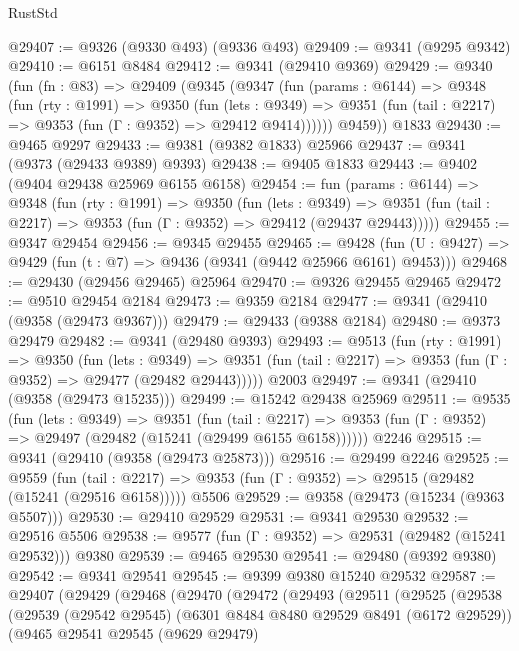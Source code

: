 \begin{lexlean}{RustStd}
\begin{coremodule}
@29407 := @9326 (@9330 @493) (@9336 @493)
@29409 := @9341 (@9295 @9342)
@29410 := @6151 @8484
@29412 := @9341 (@29410 @9369)
@29429 := @9340
    (fun (fn : @83) =>
    @29409
      (@9345
        (@9347
          (fun (params : @6144) =>
          @9348
            (fun (rty : @1991) =>
            @9350
              (fun (lets : @9349) =>
              @9351 (fun (tail : @2217) => @9353 (fun (Γ : @9352) => @29412 @9414))))))
        @9459))
    @1833
@29430 := @9465 @9297
@29433 := @9381 (@9382 @1833) @25966
@29437 := @9341 (@9373 (@29433 @9389) @9393)
@29438 := @9405 @1833
@29443 := @9402 (@9404 @29438 @25969 @6155 @6158)
@29454 := fun (params : @6144) =>
  @9348
    (fun (rty : @1991) =>
    @9350
      (fun (lets : @9349) =>
      @9351 (fun (tail : @2217) => @9353 (fun (Γ : @9352) => @29412 (@29437 @29443)))))
@29455 := @9347 @29454
@29456 := @9345 @29455
@29465 := @9428
    (fun (U : @9427) => @9429 (fun (t : @7) => @9436 (@9341 (@9442 @25966 @6161) @9453)))
@29468 := @29430 (@29456 @29465) @25964
@29470 := @9326 @29455 @29465
@29472 := @9510 @29454 @2184
@29473 := @9359 @2184
@29477 := @9341 (@29410 (@9358 (@29473 @9367)))
@29479 := @29433 (@9388 @2184)
@29480 := @9373 @29479
@29482 := @9341 (@29480 @9393)
@29493 := @9513
    (fun (rty : @1991) =>
    @9350
      (fun (lets : @9349) =>
      @9351 (fun (tail : @2217) => @9353 (fun (Γ : @9352) => @29477 (@29482 @29443)))))
    @2003
@29497 := @9341 (@29410 (@9358 (@29473 @15235)))
@29499 := @15242 @29438 @25969
@29511 := @9535
    (fun (lets : @9349) =>
    @9351
      (fun (tail : @2217) =>
      @9353 (fun (Γ : @9352) => @29497 (@29482 (@15241 (@29499 @6155 @6158))))))
    @2246
@29515 := @9341 (@29410 (@9358 (@29473 @25873)))
@29516 := @29499 @2246
@29525 := @9559
    (fun (tail : @2217) => @9353 (fun (Γ : @9352) => @29515 (@29482 (@15241 (@29516 @6158)))))
    @5506
@29529 := @9358 (@29473 (@15234 (@9363 @5507)))
@29530 := @29410 @29529
@29531 := @9341 @29530
@29532 := @29516 @5506
@29538 := @9577 (fun (Γ : @9352) => @29531 (@29482 (@15241 @29532))) @9380
@29539 := @9465 @29530
@29541 := @29480 (@9392 @9380)
@29542 := @9341 @29541
@29545 := @9399 @9380 @15240 @29532
@29587 := @29407
    (@29429
      (@29468
        (@29470
          (@29472
            (@29493
              (@29511
                (@29525
                  (@29538
                    (@29539
                      (@29542 @29545)
                      (@6301 @8484 @8480 @29529 @8491 (@6172 @29529))
                      (@9465
                        @29541
                        @29545
                        (@9629 @29479)

\end{coremodule}
\end{lexlean}
